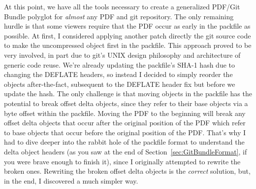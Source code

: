 \documentclass{article}
\begin{document}
At this point, we have all the tools necessary to create a generalized
PDF/Git Bundle polyglot for \emph{almost} any PDF and git
repository. The only remaining hurdle is that some viewers require
that the PDF occur as early in the packfile as possible. At first, I
considered applying another patch directly the git source code to make
the uncompressed object first in the packfile. This approach proved to
be very involved, in part due to git's UNIX design philosophy and
architecture of generic code reuse. We're already updating the
packfile's SHA-1 hash due to changing the DEFLATE headers, so instead
I decided to simply reorder the objects after-the-fact, subsequent to
the DEFLATE header fix but before we update the hash. The only
challenge is that moving objects in the packfile has the potential to
break offset delta objects, since they refer to their base objects via
a byte offset within the packfile.  Moving the PDF to the beginning
will break any offset delta objects that occur after the original
position of the PDF which refer to base objects that occur before the
original position of the PDF. That's why I had to dive deeper into the
rabbit hole of the packfile format to understand the delta object
headers (as you saw at the end of Section~\ref{sec:GitBundleFormat},
if you were brave enough to finish it), since I originally attempted
to rewrite the broken ones. Rewriting the broken offset delta objects
is the \emph{correct} solution, but, in the end, I discovered a much
simpler way.

\begin{center}
\end{center}
\end{document}
